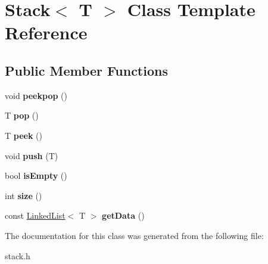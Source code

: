 \hypertarget{classStack}{}\section{Stack$<$ T $>$ Class Template Reference}
\label{classStack}
\subsection*{Public Member Functions}
\begin{DoxyCompactItemize}
\item 
void {\bfseries peekpop} ()\hypertarget{classStack_ac39a8ea250471e50e8dfd10513628b1d}{}\label{classStack_ac39a8ea250471e50e8dfd10513628b1d}

\item 
T {\bfseries pop} ()\hypertarget{classStack_aa2ea0e8c3293648589dd734d52487408}{}\label{classStack_aa2ea0e8c3293648589dd734d52487408}

\item 
T {\bfseries peek} ()\hypertarget{classStack_adcb4774ac8aa94cbc19b461da9bdee3a}{}\label{classStack_adcb4774ac8aa94cbc19b461da9bdee3a}

\item 
void {\bfseries push} (T)\hypertarget{classStack_a23b04908bc297e161d12aa75f5382bfd}{}\label{classStack_a23b04908bc297e161d12aa75f5382bfd}

\item 
bool {\bfseries is\+Empty} ()\hypertarget{classStack_ad0db0d9b249e871bb7504ed89a99d3a7}{}\label{classStack_ad0db0d9b249e871bb7504ed89a99d3a7}

\item 
int {\bfseries size} ()\hypertarget{classStack_a3091d98f798b1b3e69b644d5b778c428}{}\label{classStack_a3091d98f798b1b3e69b644d5b778c428}

\item 
const \hyperlink{classLinkedList}{Linked\+List}$<$ T $>$ {\bfseries get\+Data} ()\hypertarget{classStack_a47c539f6dd0d81ae114a5d51c1fc0d10}{}\label{classStack_a47c539f6dd0d81ae114a5d51c1fc0d10}

\end{DoxyCompactItemize}


The documentation for this class was generated from the following file\+:\begin{DoxyCompactItemize}
\item 
stack.\+h\end{DoxyCompactItemize}
